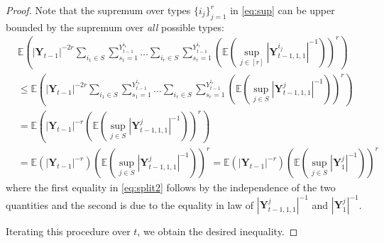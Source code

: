 \documentclass[10pt,a4paper]{amsart}
\begin{document}
\begin{proof}
Note that the supremum over types $\{i_j\}_{j=1}^r$ in \eqref{eq:sup} can be upper bounded by the supremum over \emph{all} possible types:
\begin{align}
&\mathbb{E}\left(|\boldsymbol{Y}_{t-1}|^{-2r}\sum_{i_1 \in S}\sum_{s_1=1}^{Y_{t-1}^{i_1}} \dots \sum_{i_r \in S}\sum_{s_r=1}^{Y_{t-1}^{i_r}}\left(\mathbb{E}\left(\sup_{j \in [r]}|\boldsymbol{Y}_{t-1,1,1}^{i_j}|^{-1}\right)\right)^r\right) \nonumber\\
    & \le  \mathbb{E}\left(|\boldsymbol{Y}_{t-1}|^{-2r}\sum_{i_1 \in S}\sum_{s_1=1}^{Y_{t-1}^{i_1}} \dots \sum_{i_r \in S}\sum_{s_r=1}^{Y_{t-1}^{i_r}}\left(\mathbb{E}\left(\sup_{j \in S}|\boldsymbol{Y}^j_{t-1, 1, 1}|^{-1}\right)\right)^r\right)  \nonumber \\
    & = \mathbb{E}\left(|\boldsymbol{Y}_{t-1}|^{-r}\left(\mathbb{E}\left(\sup_{j \in S}|\boldsymbol{Y}^j_{t-1, 1, 1}|^{-1}\right)\right)^r\right) \nonumber\\
    & = \mathbb{E}\left(|\boldsymbol{Y}_{t-1}|^{-r}\right)\left(\mathbb{E}\left(\sup_{j \in S}|\boldsymbol{Y}^j_{t-1, 1, 1}|^{-1}\right)\right)^r = \mathbb{E}\left(|\boldsymbol{Y}_{t-1}|^{-r}\right)\left(\mathbb{E}\left(\sup_{j \in S}|\boldsymbol{Y}_1^j|^{-1}\right)\right)^r  \label{eq:split2}%
    \end{align}
where the first equality in \eqref{eq:split2} follows by the independence of the two quantities and the second is due to the equality in law of $|\boldsymbol{Y}^j_{t-1, 1, 1}|^{-1}$ and $|\boldsymbol{Y}_1^j|^{-1}$.

Iterating this procedure over $t$, we obtain the desired inequality. %
\end{proof}
\end{document}
